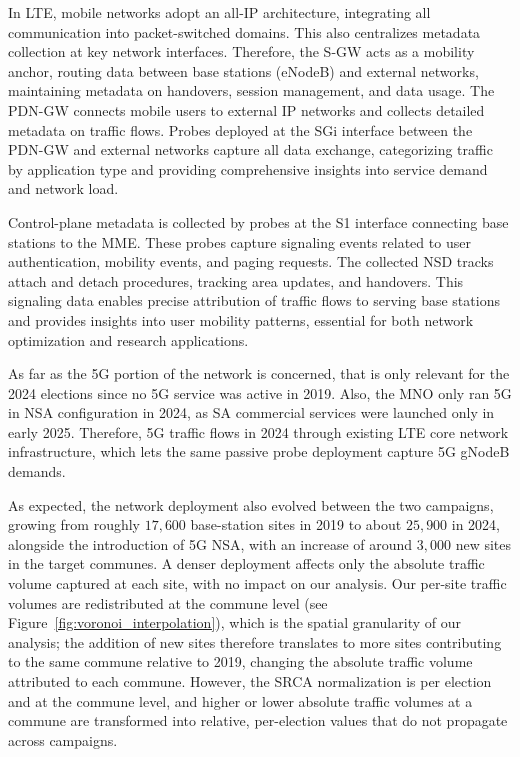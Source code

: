 \documentclass[9pt,sigconf,letterpaper]{acmart}
\begin{document}
In \ac{LTE}, mobile networks adopt an all-IP architecture, integrating all communication into packet-switched domains. This also centralizes metadata collection at key network interfaces. Therefore, the \ac{S-GW} acts as a mobility anchor, routing data between base stations (\ac{eNodeB}) and external networks, maintaining metadata on handovers, session management, and data usage. The \ac{PDN-GW} connects mobile users to external IP networks and collects detailed metadata on traffic flows. Probes deployed at the \ac{SGi} interface between the \ac{PDN-GW} and external networks capture all data exchange, categorizing traffic by application type and providing comprehensive insights into service demand and network load.

Control-plane metadata is collected by probes at the S1 interface connecting base stations to the \ac{MME}. These probes capture signaling events related to user authentication, mobility events, and paging requests.
The collected \ac{NSD} tracks attach and detach procedures, tracking area updates, and handovers. This signaling data enables precise attribution of traffic flows to serving base stations and provides insights into user mobility patterns, essential for both network optimization and research applications.

As far as the 5G portion of the network is concerned, that is only relevant for the 2024 elections since no 5G service was active in 2019. Also, the \ac{MNO} only ran 5G in \ac{NSA} configuration in 2024, as \ac{SA} commercial services were launched only in early 2025.
Therefore, 5G traffic flows in 2024 through existing LTE core network infrastructure, which lets the same passive probe deployment capture 5G \ac{gNodeB} demands.

As expected, the network deployment also evolved between the two campaigns, growing from roughly $17{,}600$ base-station sites in 2019 to about $25{,}900$ in 2024, alongside the introduction of 5G \ac{NSA}, with an increase of around $3{,}000$ new sites in the target communes.
A denser deployment affects only the absolute traffic volume captured at each site, with no impact on our analysis.
Our per-site traffic volumes are redistributed at the commune level (see Figure~\ref{fig:voronoi_interpolation}), which is the spatial granularity of our analysis; the addition of new sites therefore translates to more sites contributing to the same commune relative to 2019, changing the absolute traffic volume attributed to each commune.
However, the \ac{SRCA} normalization is per election and at the commune level, and higher or lower absolute traffic volumes at a commune are transformed into relative, per-election values that do not propagate across campaigns.
\end{document}
